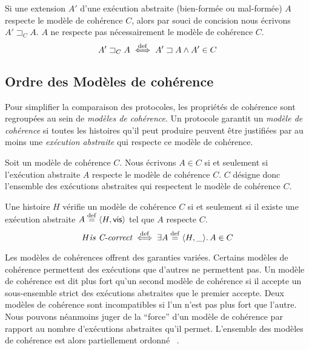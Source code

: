 \begin{definition}\label{def:consistent-extension}
Si une extension $A'$ d'une exécution abstraite (bien-formée ou mal-formée) $A$ respecte le modèle de cohérence $C$, alors par souci de concision nous écrivons $A' \sqsupset_C A$.
$A$ ne respecte pas nécessairement le modèle de cohérence $C$.
\begin{equation*}
A' \sqsupset_C A \defiff A' \sqsupset A \land A' \in C
\end{equation*}
\end{definition}



\subsection{Ordre des Modèles de cohérence}\label{subsec:consistency-spec-hier}

Pour simplifier la comparaison des protocoles, les propriétés de cohérence sont regroupées au sein de \emph{modèles de cohérence}.
Un protocole garantit un \emph{modèle de cohérence} si toutes les histoires qu'il peut produire peuvent être justifiées par au moins une \emph{exécution abstraite} qui respecte ce modèle de cohérence.

\begin{definition}\label{def:consistency-model}
Soit un modèle de cohérence $C$.
Nous écrivons $A \in C$ si et seulement si l'exécution abstraite $A$ respecte le modèle de cohérence $C$.
$C$ désigne donc l'ensemble des exécutions abstraites qui respectent le modèle de cohérence $C$.
\end{definition}

\begin{definition}\label{def:correct-history}
Une histoire $H$ vérifie un modèle de cohérence $C$ si et seulement si il existe une exécution abstraite $A \defeq \tuple*{H, \trm{vis}}$ tel que $A$ respecte $C$.
\begin{equation*}
    H \textit{is C-correct} \defiff \exists A \defeq \tuple*{H, \_} \qsep A \in C
\end{equation*}
\end{definition}

Les modèles de cohérences offrent des garanties variées.
Certains modèles de cohérence permettent des exécutions que d'autres ne permettent pas.
Un modèle de cohérence est dit plus fort qu'un second modèle de cohérence si il accepte un sous-ensemble strict des exécutions abstraites que le premier accepte.
Deux modèles de cohérence sont incompatibles si l'un n'est pas plus fort que l'autre.
Nous pouvons néanmoins juger de la \enquote{force} d'un modèle de cohérence par rapport au nombre d'exécutions abstraites qu'il permet.
L'ensemble des modèles de cohérence est alors partiellement ordonné
~\autocite{viotti_consistency_2016}.

